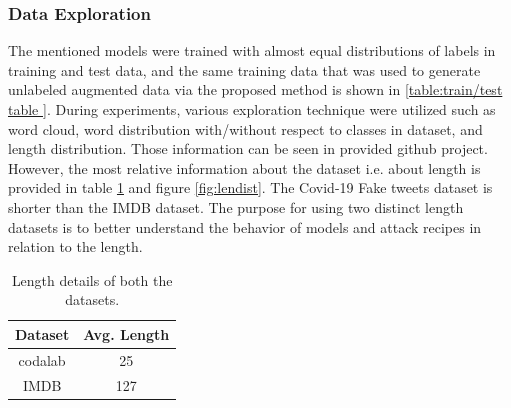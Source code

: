 \documentclass[%
	BCOR=8mm, %
	DIV=12,
	toc=bibliography, %
	toc=listof, %
	oneside, %
	egregdoesnotlikesansseriftitles, %
	]{scrbook}
\begin{document}
\subsubsection{Data Exploration}
\label{subsection:dataexploration}
The mentioned models were trained with almost equal distributions of labels in training and test data, and the same training data that was used to generate unlabeled augmented data via the proposed method is shown in \ref{table:train/test table }.
During experiments, various exploration technique were utilized such as word cloud, word distribution with/without respect to classes in dataset, and length distribution. Those information can be seen in provided github project. However, the most relative information about the dataset i.e. about length is provided in table \ref{table:Length stat } and figure \ref{fig:lendist}.
The Covid-19 Fake tweets dataset is shorter than the IMDB dataset. The purpose for using two distinct length datasets is to better understand the behavior of models and attack recipes in relation to the length.
\begin{table}[!h]
\centering
\begin{tabular}{ |c|c| }
\hline
Dataset &  Avg. Length  \\
\hline
codalab & 25  \\
IMDB & 127  \\
\hline
\end{tabular}
\caption[Length details of datasets]{Length details of both the datasets.}
\label{table:Length stat }
\end{table}
\end{document}
